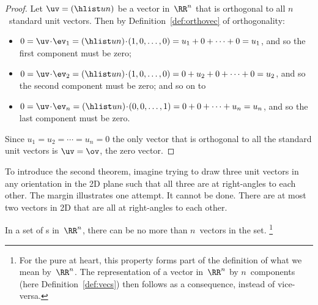 \begin{proof} 
Let \(\uv=(\hlist un)\) be a vector in~\(\RR^n\) that is orthogonal to all \(n\)~standard unit vectors.  
Then by Definition~\ref{def:orthovec} of orthogonality:
\begin{itemize}
\item \(0=\uv\cdot\ev_1=(\hlist un)\cdot(1,0,\ldots,0)=u_1+0+\cdots+0=u_1\), and so the first component must be zero;
\item \(0=\uv\cdot\ev_2=(\hlist un)\cdot(1,0,\ldots,0)=0+u_2+0+\cdots+0=u_2\), and so the second component must be zero; and so on to
\item \(0=\uv\cdot\ev_n=(\hlist un)\cdot(0,0,\ldots,1)=0+0+\cdots+u_n=u_n\), and so the last component must be zero.
\end{itemize}
Since \(u_1=u_2=\cdots=u_n=0\) the only vector that is orthogonal to all the standard unit vectors is \(\uv=\ov\), the zero vector.
\end{proof}


To introduce the second theorem, imagine trying to draw three unit vectors in any orientation in the 2D plane such that all three are at right-angles to each other.
The margin illustrates one attempt.
It cannot be done.
There are at most two vectors in 2D that are all at right-angles to each other.


\begin{theorem} \label{thm:orthcomp}
In a set of  s in~\(\RR^n\), there can be no more than \(n\)~vectors in the set.
\footnote{For the pure at heart, this property forms part of the definition of what we mean by~\(\RR^n\).  
The representation of a vector in~\(\RR^n\) by \(n\)~components (here Definition~\ref{def:vecs}) then follows as a consequence, instead of vice-versa.}
\end{theorem}


